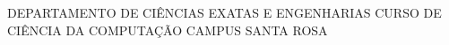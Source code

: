 
\frenchspacing 

\newpage

\pretextual

\begin{capa} 
   \center
  {\ABNTEXsubsectionfont\large \imprimirinstituicao} \linebreak
  {\ABNTEXsubsectionfont\large DEPARTAMENTO DE CIÊNCIAS EXATAS E ENGENHARIAS} \linebreak
  {\ABNTEXsubsectionfont\large CURSO DE CIÊNCIA DA COMPUTAÇÃO} \linebreak
  {\ABNTEXsubsectionfont\large CAMPUS SANTA ROSA}
   \vfill
   \ABNTEXchapterfont\Large\bfseries{\MakeUppercase{\imprimirtitulo}}
   \vfill
   \begin{center}
   \ABNTEXchapterfont\large\bfseries\textsc{\MakeUppercase{\imprimirautor}}
   \end{center}
   \vfill
   \vspace*{5cm}
   \large\normalfont\MakeTextUppercase{\imprimirlocal} \\
   \large\normalfont\the\year
   \vspace*{1cm}
\end{capa}

\makeatletter

